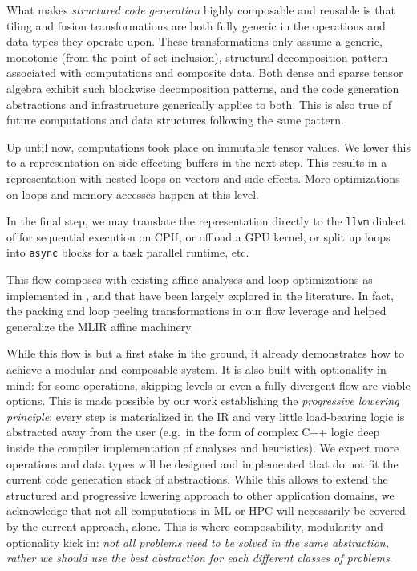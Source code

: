 What makes \emph{structured code generation} highly composable and reusable is that tiling and fusion transformations are both fully generic in the operations and data types they operate upon. 
These transformations only assume a generic, monotonic (from the point of set inclusion), structural decomposition pattern associated with computations and composite data. 
Both dense and sparse tensor algebra exhibit such blockwise decomposition patterns, and the code generation abstractions and infrastructure generically applies to both.
This is also true of future computations and data structures following the same pattern.

Up until now, computations took place on immutable tensor values. 
We lower this to a representation on side-effecting buffers in the next step. 
This results in a representation with nested loops on vectors and side-effects.
More optimizations on loops and memory accesses happen at this level.

In the final step, we may translate the representation directly to the \lstinline|llvm| dialect of \MLIR for sequential execution on CPU, or offload a GPU kernel, or split up loops into \lstinline|async| blocks for a task parallel runtime, etc.

This flow composes with existing affine analyses and loop optimizations as implemented in \MLIR, and that have been largely explored in the literature.
In fact, the packing and loop peeling transformations in our flow leverage and helped generalize the MLIR affine machinery.

While this flow is but a first stake in the ground, it already demonstrates how to achieve a modular and composable system.
It is also built with optionality in mind: for some operations, skipping levels or even a fully divergent flow are viable options.
This is made possible by our work establishing the \emph{progressive lowering principle}: every step is materialized in the IR and very little load-bearing logic is abstracted away from the user (e.g.\ in the form of complex C++ logic deep inside the compiler implementation of analyses and heuristics).
We expect more operations and data types will be designed and implemented that do not fit the current code generation stack of abstractions.
While this allows to extend the structured and progressive lowering approach to other application domains, we acknowledge that not all computations in ML or HPC will necessarily be covered by the current approach, alone.
This is where composability, modularity and optionality kick in: \emph{not all problems need to be solved in the same abstraction, rather we should use the best abstraction for each different classes of problems}.

